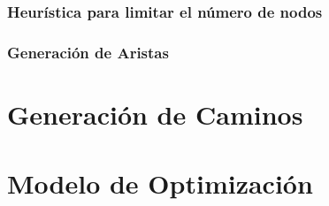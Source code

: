 
\subsubsection{Heurística para limitar el n\'umero de nodos}

\subsubsection{Generaci\'on de Aristas}



\section{Generaci\'on de Caminos}


\section{Modelo de Optimización}
